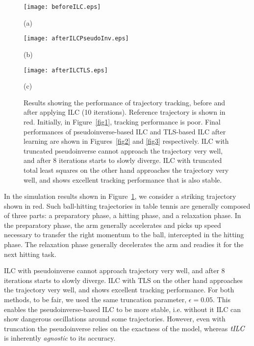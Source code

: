 %
\begin{figure}[!htb]
    \centering
    \begin{minipage}{.25\textwidth}
        \centering
        \texttt{[image: beforeILC.eps]}
        \caption{(a)}
        \label{fig1}
    \end{minipage}%
    \begin{minipage}{.25\textwidth}
        \centering
        \texttt{[image: afterILCPseudoInv.eps]}
        \caption{(b)}
        \label{fig2}
    \end{minipage}
    \begin{minipage}{.25\textwidth}
        \centering
        \texttt{[image: afterILCTLS.eps]}
        \caption{(c)}
        \label{fig3}
    \end{minipage}
    \caption{Results showing the performance of trajectory tracking, before and after applying ILC (10 iterations). Reference trajectory is shown in red. Initially, in Figure~\ref{fig1}, tracking performance is poor. Final performances of pseudoinverse-based ILC and TLS-based ILC after learning are shown in Figures~\ref{fig2} and \ref{fig3} respectively. ILC with truncated pseudoinverse cannot approach the trajectory very well, and after 8 iterations starts to slowly diverge. ILC with truncated total least squares on the other hand approaches the trajectory very well, and shows excellent tracking performance that is also stable.}
\label{FigureILC}
\end{figure}

In the simulation results shown in Figure~\ref{FigureILC}, we consider a striking trajectory shown in red. Such ball-hitting trajectories in table tennis are generally composed of three parts: a preparatory phase, a hitting phase, and a relaxation phase. In the preparatory phase, the arm generally accelerates and picks up speed necessary to transfer the right momentum to the ball, intercepted in the hitting phase. The relaxation phase generally decelerates the arm and readies it for the next hitting task. 

ILC with pseudoinverse cannot approach trajectory very well, and after 8 iterations starts to slowly diverge. ILC with TLS on the other hand approaches the trajectory very well, and shows excellent tracking performance. For both methods, to be fair, we used the same truncation parameter, $\epsilon = 0.05$. This enables the pseudoinverse-based ILC to be more stable, i.e. without it ILC can show dangerous oscillations around some trajectories. However, even with truncation the pseudoinverse relies on the exactness of the model, whereas $\emph{tILC}$ is inherently \emph{agnostic} to its accuracy. 

